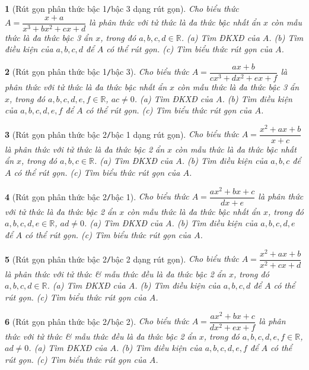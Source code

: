 \documentclass{article}
\newtheorem{baitoan}{}
\begin{document}
\begin{baitoan}[Rút gọn phân thức bậc 1{\tt/}bậc 3 dạng rút gọn]
	Cho biểu thức $A = \dfrac{x + a}{x^3 + bx^2 + cx + d}$ là phân thức với tử thức là đa thức bậc nhất ẩn $x$ còn mẫu thức là đa thức bậc 3 ẩn $x$, trong đó $a,b,c,d\in\mathbb{R}$. (a) Tìm {\rm ĐKXĐ} của $A$. (b) Tìm điều kiện của $a,b,c,d$ để $A$ có thể rút gọn. (c) Tìm biểu thức rút gọn của $A$.
\end{baitoan}

\begin{baitoan}[Rút gọn phân thức bậc 1{\tt/}bậc 3]
	Cho biểu thức $A = \dfrac{ax + b}{cx^3 + dx^2 + ex + f}$ là phân thức với tử thức là đa thức bậc nhất ẩn $x$ còn mẫu thức là đa thức bậc 3 ẩn $x$, trong đó $a,b,c,d,e,f\in\mathbb{R}$, $ac\ne0$. (a) Tìm {\rm ĐKXĐ} của $A$. (b) Tìm điều kiện của $a,b,c,d,e,f$ để $A$ có thể rút gọn. (c) Tìm biểu thức rút gọn của $A$.
\end{baitoan}

\begin{baitoan}[Rút gọn phân thức bậc 2{\tt/}bậc 1 dạng rút gọn]
	Cho biểu thức $A = \dfrac{x^2 + ax + b}{x + c}$ là phân thức với tử thức là đa thức bậc 2 ẩn $x$ còn mẫu thức là đa thức bậc nhất ẩn $x$, trong đó $a,b,c\in\mathbb{R}$. (a) Tìm {\rm ĐKXĐ} của $A$. (b) Tìm điều kiện của $a,b,c$ để $A$ có thể rút gọn. (c) Tìm biểu thức rút gọn của $A$.
\end{baitoan}

\begin{baitoan}[Rút gọn phân thức bậc 2{\tt/}bậc 1]
	Cho biểu thức $A = \dfrac{ax^2 + bx + c}{dx + e}$ là phân thức với tử thức là đa thức bậc 2 ẩn $x$ còn mẫu thức là đa thức bậc nhất ẩn $x$, trong đó $a,b,c,d,e\in\mathbb{R}$, $ad\ne0$. (a) Tìm {\rm ĐKXĐ} của $A$. (b) Tìm điều kiện của $a,b,c,d,e$ để $A$ có thể rút gọn. (c) Tìm biểu thức rút gọn của $A$.
\end{baitoan}

\begin{baitoan}[Rút gọn phân thức bậc 2{\tt/}bậc 2 dạng rút gọn]
	Cho biểu thức $A = \dfrac{x^2 + ax + b}{x^2 + cx + d}$ là phân thức với tử thức \& mẫu thức đều là đa thức bậc 2 ẩn $x$, trong đó $a,b,c,d\in\mathbb{R}$. (a) Tìm {\rm ĐKXĐ} của $A$. (b) Tìm điều kiện của $a,b,c,d$ để $A$ có thể rút gọn. (c) Tìm biểu thức rút gọn của $A$.
\end{baitoan}

\begin{baitoan}[Rút gọn phân thức bậc 2{\tt/}bậc 2]
	Cho biểu thức $A = \dfrac{ax^2 + bx + c}{dx^2 + ex + f}$ là phân thức với tử thức \& mẫu thức đều là đa thức bậc 2 ẩn $x$, trong đó $a,b,c,d,e,f\in\mathbb{R}$, $ad\ne0$. (a) Tìm {\rm ĐKXĐ} của $A$. (b) Tìm điều kiện của $a,b,c,d,e,f$ để $A$ có thể rút gọn. (c) Tìm biểu thức rút gọn của $A$.
\end{baitoan}
\end{document}
